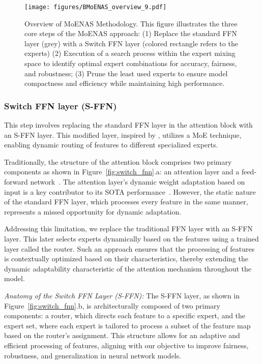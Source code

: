 \begin{figure}[ht]
    \centering \texttt{[image: figures/BMoENAS\_overview\_9.pdf]}
    \caption{Overview of MoENAS Methodology. This figure illustrates the three core steps of the MoENAS approach: (1) Replace the standard FFN layer (grey) with a Switch FFN layer (colored rectangle refers to the experts) (2) Execution of a search process within the expert mixing space to identify optimal expert combinations for accuracy, fairness, and robustness; (3) Prune the least used experts to ensure model compactness and efficiency while maintaining high performance.}
    \label{fig:MoENAS_details}
\end{figure}


\subsubsection{Switch FFN layer (S-FFN)}
\label{method:switch-fnn}
%
This step involves replacing the standard FFN layer in the attention block with an S-FFN layer. This modified layer, inspired by \cite{fedus2022switch}, utilizes a MoE technique, enabling dynamic routing of features to different specialized experts. 

Traditionally, the structure of the attention block comprises two primary components as shown in Figure~\ref{fig:switch_fnn}.a: an attention layer and a feed-forward network~\cite{vaswani2017attention}. The attention layer's dynamic weight adaptation based on input is a key contributor to its SOTA performance~\cite{khan2022transformers}. However, the static nature of the standard FFN layer, which processes every feature in the same manner, represents a missed opportunity for dynamic adaptation.

Addressing this limitation, we replace the traditional FFN layer with an S-FFN layer. This later selects experts dynamically based on the features using a trained layer called the router. Such an approach ensures that the processing of features is contextually optimized based on their characteristics, thereby extending the dynamic adaptability characteristic of the attention mechanism throughout the model.

\textit{Anatomy of the Switch FFN Layer (S-FFN):} 
The S-FFN layer, as shown in Figure~\ref{fig:switch_fnn}.b, is architecturally composed of two primary components: a router, which directs each feature to a specific expert, and the expert set, where each expert is tailored to process a subset of the feature map based on the router's assignment. This structure allows for an adaptive and efficient processing of features, aligning with our objective to improve fairness, robustness, and generalization in neural network models.
\newline

